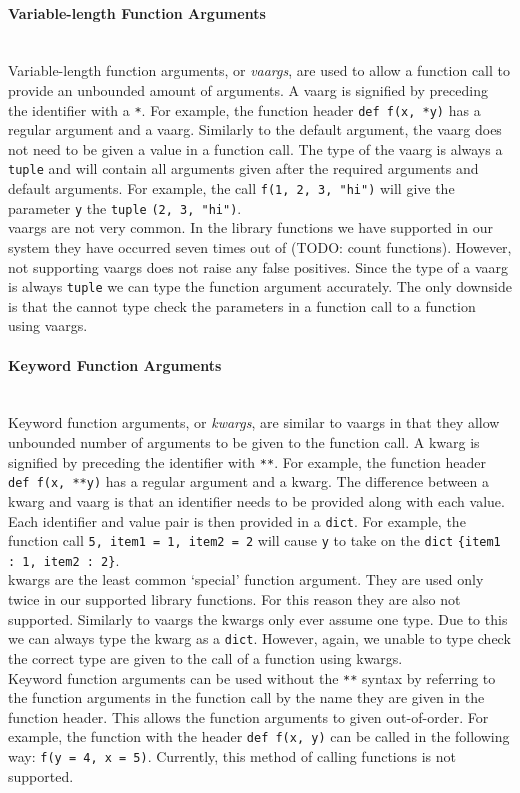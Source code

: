 \documentclass[12pt, titlepage]{article}
\begin{document}
\paragraph*{Variable-length Function Arguments}\mbox{} \\
Variable-length function arguments, or \textit{vaargs}, are used to allow a function call to provide an unbounded amount of arguments. A vaarg is signified by preceding the identifier with a \texttt{*}. For example, the function header \texttt{def f(x, *y)} has a regular argument and a vaarg. Similarly to the default argument, the vaarg does not need to be given a value in a function call. The type of the vaarg is always a \texttt{tuple} and will contain all arguments given after the required arguments and default arguments. For example, the call \texttt{f(1, 2, 3, "hi")} will give the parameter \texttt{y} the \texttt{tuple} \texttt{(2, 3, "hi")}. \\
\indent vaargs are not very common. In the library functions we have supported in our system they have occurred seven times out of (TODO: count functions). However, not supporting vaargs does not raise any false positives. Since the type of a vaarg is always \texttt{tuple} we can type the function argument accurately. The only downside is that the cannot type check the parameters in a function call to a function using vaargs. 

\paragraph*{Keyword Function Arguments}\mbox{} \\
Keyword function arguments, or \textit{kwargs}, are similar to vaargs in that they allow unbounded number of arguments to be given to the function call. A kwarg is signified by preceding the identifier with \texttt{**}. For example, the function header \texttt{def f(x, **y)} has a regular argument and a kwarg. The difference between a kwarg and vaarg is that an identifier needs to be provided along with each value. Each identifier and value pair is then provided in a \texttt{dict}. For example, the function call \texttt{5, item1 = 1, item2 = 2} will cause \texttt{y} to take on the \texttt{dict} \texttt{\{item1 : 1, item2 : 2\}}. \\
\indent kwargs are the least common `special' function argument. They are used only twice in our supported library functions. For this reason they are also not supported. Similarly to vaargs the kwargs only ever assume one type. Due to this we can always type the kwarg as a \texttt{dict}. However, again, we unable to type check the correct type are given to the call of a function using kwargs. \\
\indent Keyword function arguments can be used without the \texttt{**} syntax by referring to the function arguments in the function call by the name they are given in the function header. This allows the function arguments to given out-of-order. For example, the function with the header \texttt{def f(x, y)} can be called in the following way: \texttt{f(y = 4, x = 5)}. Currently, this method of calling functions is not supported.
\end{document}

